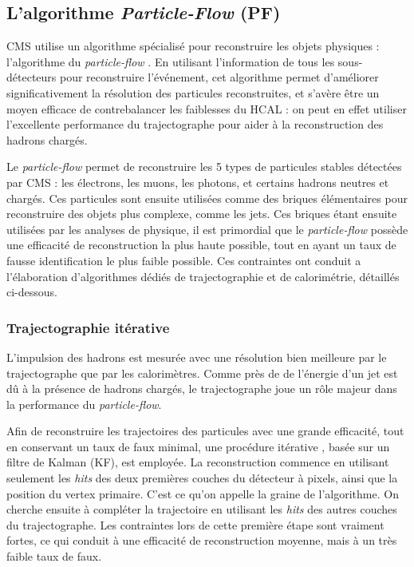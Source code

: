 \subsection{L'algorithme \emph{Particle-Flow} (PF)}

CMS utilise un algorithme spécialisé pour reconstruire les objets physiques : l'algorithme du \emph{particle-flow} \citep{pf,cms_pf_2,cms_pf_jets,cms_pf_leptons}. En utilisant l'information de tous les sous-détecteurs pour reconstruire l'événement, cet algorithme permet d'améliorer significativement la résolution des particules reconstruites, et s'avère être un moyen efficace de contrebalancer les faiblesses du HCAL : on peut en effet utiliser l'excellente performance du trajectographe pour aider à la reconstruction des hadrons chargés.

Le \emph{particle-flow} permet de reconstruire les 5 types de particules stables détectées par CMS : les électrons, les muons, les photons, et certains hadrons neutres et chargés. Ces particules sont ensuite utilisées comme des briques élémentaires pour reconstruire des objets plus complexe, comme les jets. Ces briques étant ensuite utilisées par les analyses de physique, il est primordial que le \emph{particle-flow} possède une efficacité de reconstruction la plus haute possible, tout en ayant un taux de fausse identification le plus faible possible. Ces contraintes ont conduit a l'élaboration d'algorithmes dédiés de trajectographie et de calorimétrie, détaillés ci-dessous.

\subsubsection{Trajectographie itérative} \label{sec:tracks_reconstruction}

L'impulsion des hadrons est mesurée avec une résolution bien meilleure par le trajectographe que par les calorimètres. Comme près de  de l'énergie d'un jet est dû à la présence de hadrons chargés, le trajectographe joue un rôle majeur dans la performance du \emph{particle-flow}.

Afin de reconstruire les trajectoires des particules avec une grande efficacité, tout en conservant un taux de faux minimal, une procédure itérative \citep{cms_tracks}, basée sur un filtre de Kalman (KF), est employée. La reconstruction commence en utilisant seulement les \emph{hits} des deux premières couches du détecteur à pixels, ainsi que la position du vertex primaire. C'est ce qu'on appelle la graine de l'algorithme. On cherche ensuite à compléter la trajectoire en utilisant les \emph{hits} des autres couches du trajectographe. Les contraintes lors de cette première étape sont vraiment fortes, ce qui conduit à une efficacité de reconstruction moyenne, mais à un très faible taux de faux.

